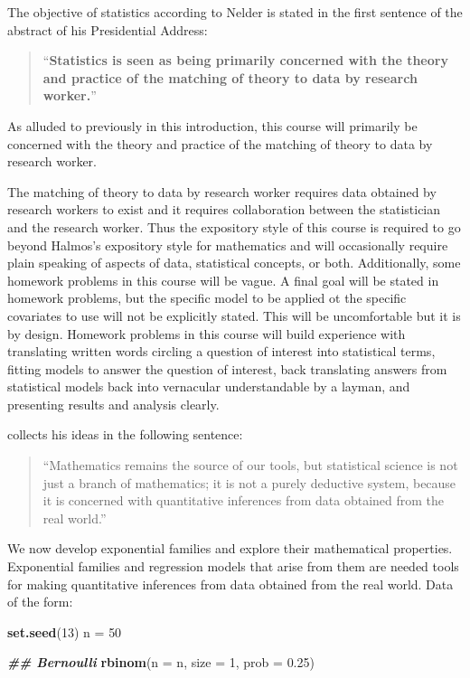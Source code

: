 \documentclass[
]{article}
\newenvironment{Shaded}{\begin{snugshade}}{\end{snugshade}}
\newcommand{\AttributeTok}[1]{\textcolor[rgb]{0.13,0.29,0.53}{#1}}
\newcommand{\DecValTok}[1]{\textcolor[rgb]{0.00,0.00,0.81}{#1}}
\newcommand{\DocumentationTok}[1]{\textcolor[rgb]{0.56,0.35,0.01}{\textbf{\textit{#1}}}}
\newcommand{\FloatTok}[1]{\textcolor[rgb]{0.00,0.00,0.81}{#1}}
\newcommand{\FunctionTok}[1]{\textcolor[rgb]{0.13,0.29,0.53}{\textbf{#1}}}
\newcommand{\NormalTok}[1]{#1}
\newcommand{\OtherTok}[1]{\textcolor[rgb]{0.56,0.35,0.01}{#1}}
\begin{document}
The objective of statistics according to Nelder is stated in the first
sentence of the abstract of his Presidential Address:

\begin{quote}
``\textbf{Statistics is seen as being primarily concerned with the
theory and practice of the matching of theory to data by research
worker.}''
\end{quote}

As alluded to previously in this introduction, this course will
primarily be concerned with the theory and practice of the matching of
theory to data by research worker.

The matching of theory to data by research worker requires data obtained
by research workers to exist and it requires collaboration between the
statistician and the research worker. Thus the expository style of this
course is required to go beyond Halmos's expository style for
mathematics and will occasionally require plain speaking of aspects of
data, statistical concepts, or both. Additionally, some homework
problems in this course will be vague. A final goal will be stated in
homework problems, but the specific model to be applied ot the specific
covariates to use will not be explicitly stated. This will be
uncomfortable but it is by design. Homework problems in this course will
build experience with translating written words circling a question of
interest into statistical terms, fitting models to answer the question
of interest, back translating answers from statistical models back into
vernacular understandable by a layman, and presenting results and
analysis clearly.

\cite{nelder1999statistics} collects his ideas in the following
sentence:

\begin{quote}
``Mathematics remains the source of our tools, but statistical science
is not just a branch of mathematics; it is not a purely deductive
system, because it is concerned with quantitative inferences from data
obtained from the real world.''
\end{quote}

We now develop exponential families and explore their mathematical
properties. Exponential families and regression models that arise from
them are needed tools for making quantitative inferences from data
obtained from the real world. Data of the form:

\vspace{12pt}

\begin{Shaded}
\begin{Highlighting}[]
\FunctionTok{set.seed}\NormalTok{(}\DecValTok{13}\NormalTok{)}
\NormalTok{n }\OtherTok{=} \DecValTok{50}

\DocumentationTok{\#\# Bernoulli}
\FunctionTok{rbinom}\NormalTok{(}\AttributeTok{n =}\NormalTok{ n, }\AttributeTok{size =} \DecValTok{1}\NormalTok{, }\AttributeTok{prob =} \FloatTok{0.25}\NormalTok{)}
\end{Highlighting}
\end{Shaded}
\end{document}
